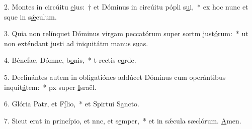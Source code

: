 2. Montes in circúitu \uline{e}jus:~† et Dóminus in circúitu pópli s\uline{u}i,~* ex hoc nunc et sque in s\uline{ǽ}culum.\par 
3. Quia non relínquet Dóminus virgam peccatórum super sortm just\uline{ó}rum:~* ut non exténdant justi ad iniquitátm manus s\uline{u}as.\par 
4. Bénefac, Dómne, b\uline{o}nis,~* t rectis c\uline{o}rde.\par 
5. Declinántes autem in obligatiónes addúcet Dóminus cum operántibus inquit\uline{á}tem:~* px super \uline{I}sraël.\par 
6. Glória Patr, et F\uline{í}lio,~* et Spirtui S\uline{a}ncto.\par 
7. Sicut erat in princípio, et nnc, et s\uline{e}mper,~* et in sǽcula sæclórum. \uline{A}men.\par 
